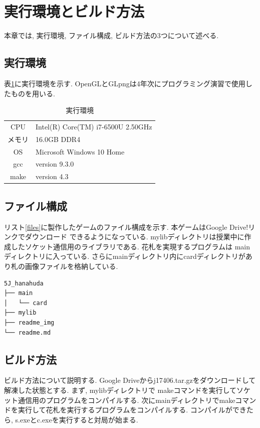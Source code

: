 \documentclass[a4j]{jarticle}
\begin{document}
    \section{実行環境とビルド方法}
    本章では, 実行環境, ファイル構成, ビルド方法の3つについて述べる.
    \subsection{実行環境}
    表\ref{env}に実行環境を示す. OpenGLとGLpngは4年次にプログラミング演習で使用したものを用いる.  
    \begin{table}[H]
        \caption{実行環境}
      \label{env}
      \begin{center}
          \begin{tabular}{c|l}\hline
            CPU & Intel(R) Core(TM) i7-6500U 2.50GHz  \\ 
            メモリ & 16.0GB DDR4 \\
            OS & Microsoft Windows 10 Home \\
            gcc &  version 9.3.0 \\
            make & version 4.3 \\ \hline
          \end{tabular}
      \end{center}
      \end{table}

    \subsection{ファイル構成}
    リスト\ref{files}に製作したゲームのファイル構成を示す. 本ゲームはGoogle Drive!リンクでダウンロード
    できるようになっている. mylibディレクトリは授業中に作成したソケット通信用のライブラリである. 花札を実現するプログラムは
    mainディレクトリに入っている. さらにmainディレクトリ内にcardディレクトリがあり札の画像ファイルを格納している.
    \begin{lstlisting}[basicstyle=\ttfamily\footnotesize, frame=single,label=files,caption=ファイル構成]
5J_hanahuda
├── main
│   └── card
├── mylib
├── readme_img
└── readme.md
    \end{lstlisting}

    \subsection{ビルド方法}
ビルド方法について説明する. Google Driveからj17406.tar.gzをダウンロードして解凍した状態とする. まず, mylibディレクトリで
makeコマンドを実行してソケット通信用のプログラムをコンパイルする. 次にmainディレクトリでmakeコマンドを実行して花札を実行するプログラムをコンパイルする.
コンパイルができたら, s.exeとc.exeを実行すると対局が始まる.
\end{document}
